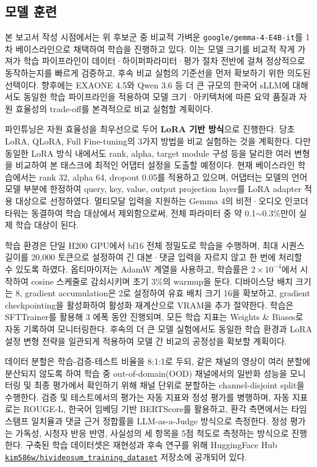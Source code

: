 \documentclass[11pt,a4paper]{article}
\begin{document}
\subsection{모델 훈련}
본 보고서 작성 시점에서는 위 후보군 중 비교적 가벼운 \texttt{google/gemma-4-E4B-it}를 1차 베이스라인으로 채택하여 학습을 진행하고 있다. 이는 모델 크기를 비교적 작게 가져가 학습 파이프라인이 데이터·하이퍼파라미터·평가 절차 전반에 걸쳐 정상적으로 동작하는지를 빠르게 검증하고, 후속 비교 실험의 기준선을 먼저 확보하기 위한 의도된 선택이다. 향후에는 EXAONE 4.5와 Qwen 3.6 등 더 큰 규모의 한국어 sLLM에 대해서도 동일한 학습 파이프라인을 적용하여 모델 크기·아키텍처에 따른 요약 품질과 자원 효율성의 trade-off를 본격적으로 비교 실험할 계획이다.

파인튜닝은 자원 효율성을 최우선으로 두어 \textbf{LoRA 기반 방식}으로 진행한다. 당초 LoRA, QLoRA, Full Fine-tuning의 3가지 방법을 비교 실험하는 것을 계획한다. 다만 동일한 LoRA 방식 내에서도 rank, alpha, target module 구성 등을 달리한 여러 변형을 비교하여 본 태스크에 최적인 어댑터 설정을 도출할 예정이다. 현재 베이스라인 학습에서는 rank 32, alpha 64, dropout 0.05를 적용하고 있으며, 어댑터는 모델의 언어 모델 부분에 한정하여 query, key, value, output projection layer를 LoRA adapter 적용 대상으로 선정하였다. 멀티모달 입력을 지원하는 Gemma 4의 비전·오디오 인코더 타워는 동결하여 학습 대상에서 제외함으로써, 전체 파라미터 중 약 0.1$\sim$0.3\%만이 실제 학습 대상이 된다.

학습 환경은 단일 H200 GPU에서 bf16 전체 정밀도로 학습을 수행하며, 최대 시퀀스 길이를 20{,}000 토큰으로 설정하여 긴 대본·댓글 입력을 자르지 않고 한 번에 처리할 수 있도록 하였다. 옵티마이저는 AdamW 계열을 사용하고, 학습률은 $2\!\times\!10^{-4}$에서 시작하여 cosine 스케줄로 감쇠시키며 초기 3\%의 warmup을 둔다. 디바이스당 배치 크기는 8, gradient accumulation은 2로 설정하여 유효 배치 크기 16을 확보하고, gradient checkpointing을 활성화하여 활성화 재계산으로 VRAM을 추가 절약한다. 학습은 SFTTrainer를 활용해 3 에폭 동안 진행되며, 모든 학습 지표는 Weights \& Biases로 자동 기록하여 모니터링한다. 후속의 더 큰 모델 실험에서도 동일한 학습 환경과 LoRA 설정 변형 전략을 일관되게 적용하여 모델 간 비교의 공정성을 확보할 계획이다.

데이터 분할은 학습-검증-테스트 비율을 8:1:1로 두되, 같은 채널의 영상이 여러 분할에 분산되지 않도록 하여 학습 중 out-of-domain(OOD) 채널에서의 일반화 성능을 모니터링 및 최종 평가에서 확인하기 위해 채널 단위로 분할하는 channel-disjoint split을 수행한다. 검증 및 테스트에서의 평가는 자동 지표와 정성 평가를 병행하며, 자동 지표로는 ROUGE-L, 한국어 임베딩 기반 BERTScore를 활용하고, 환각 측면에서는 타임스탬프 일치율과 댓글 근거 정합률을 LLM-as-a-Judge 방식으로 측정한다. 정성 평가는 가독성, 시청자 반응 반영, 사실성의 세 항목을 5점 척도로 측정하는 방식으로 진행한다. 구축된 학습 데이터셋은 재현성과 후속 연구를 위해 HuggingFace Hub \href{https://huggingface.co/datasets/kim586w/hivideosum_training_dataset}{\texttt{kim586w/hivideosum\_training\_dataset}} 저장소에 공개되어 있다.
\end{document}
